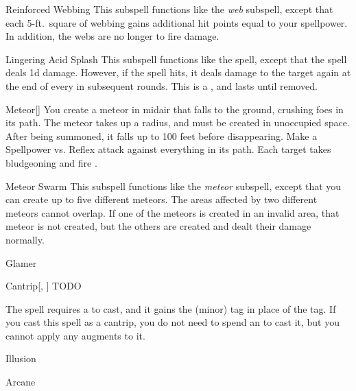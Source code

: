 \begin{ability}[\nth{4}]{Reinforced Webbing}
This subspell functions like the \textit{web} subspell, except that each 5-ft.\ square of webbing gains additional hit points equal to your spellpower.
In addition, the webs are no longer  to fire damage.
\end{ability}
\vspace{0.25em}


\begin{ability}[\nth{5}]{Lingering Acid Splash}
This subspell functions like the  spell, except that the spell deals \minus1d damage.
However, if the spell hits, it deals damage to the target again at the end of every  in subsequent rounds.
This is a , and lasts until removed.
\end{ability}
\vspace{0.25em}


\begin{ability}[\nth{5}]{Meteor}[]
You create a meteor in midair that falls to the ground, crushing foes in its path.
The meteor takes up a \areamed radius, and must be created in unoccupied space.
After being summoned, it falls up to 100 feet before disappearing.
Make a Spellpower vs. Reflex attack against everything in its path.
\hit Each target takes bludgeoning and fire .
\end{ability}
\vspace{0.25em}


\begin{ability}[\nth{8}]{Meteor Swarm}
This subspell functions like the \textit{meteor} subspell, except that you can create up to five different meteors.
The areas affected by two different meteors cannot overlap.
If one of the meteors is created in an invalid area, that meteor is not created, but the others are created and dealt their damage normally.
\end{ability}
\vspace{0.25em}

\newpage
\begin{spellsection}{Glamer}

\begin{spellheader}
\spelldesc{}
\end{spellheader}


\begin{ability}{Cantrip}[, ]
TODO
\end{ability}



 The spell requires a  to cast, and it gains the  (minor) tag in place of the  tag. If you cast this spell as a cantrip,
you do not need to spend an  to cast it,
but you cannot apply any augments to it.


 Illusion

 Arcane
\end{spellsection}


